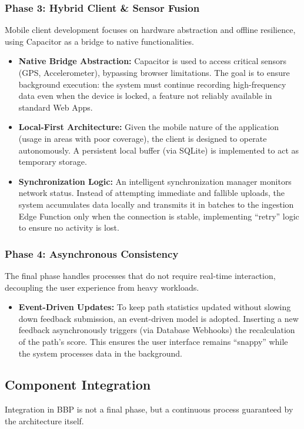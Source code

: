 \subsubsection{Phase 3: Hybrid Client \& Sensor Fusion}
Mobile client development focuses on hardware abstraction and offline resilience, using Capacitor as a bridge to native functionalities.

\begin{itemize}
    \item \textbf{Native Bridge Abstraction:} Capacitor is used to access critical sensors (GPS, Accelerometer), bypassing browser limitations. The goal is to ensure background execution: the system must continue recording high-frequency data even when the device is locked, a feature not reliably available in standard Web Apps.
    \item \textbf{Local-First Architecture:} Given the mobile nature of the application (usage in areas with poor coverage), the client is designed to operate autonomously. A persistent local buffer (via SQLite) is implemented to act as temporary storage.
    \item \textbf{Synchronization Logic:} An intelligent synchronization manager monitors network status. Instead of attempting immediate and fallible uploads, the system accumulates data locally and transmits it in batches to the ingestion Edge Function only when the connection is stable, implementing ``retry'' logic to ensure no activity is lost.
\end{itemize}

\subsubsection{Phase 4: Asynchronous Consistency}
The final phase handles processes that do not require real-time interaction, decoupling the user experience from heavy workloads.

\begin{itemize}
    \item \textbf{Event-Driven Updates:} To keep path statistics updated without slowing down feedback submission, an event-driven model is adopted. Inserting a new feedback asynchronously triggers (via Database Webhooks) the recalculation of the path's score. This ensures the user interface remains ``snappy'' while the system processes data in the background.
\end{itemize}

\subsection{Component Integration}
Integration in BBP is not a final phase, but a continuous process guaranteed by the architecture itself.

